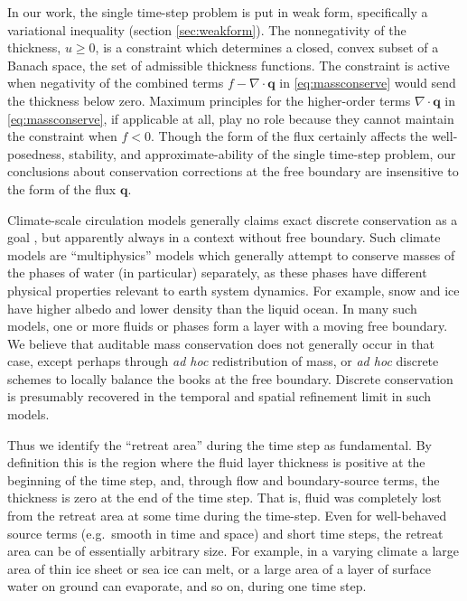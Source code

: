 \documentclass[final,leqno,onefignum,onetabnum]{siamltex1213bueler}
\newcommand\bq{\mathbf{q}}
\newcommand{\Div}{\nabla\cdot}
\begin{document}
In our work, the single time-step problem is put in weak form, specifically a variational inequality (section \ref{sec:weakform}).  The nonnegativity of the thickness, $u\ge 0$, is a constraint which determines a closed, convex subset of a Banach space, the set of admissible thickness functions.  The constraint is active when negativity of the combined terms $f - \Div \bq$ in \eqref{eq:massconserve} would send the thickness below zero.  Maximum principles for the higher-order terms $\Div\bq$ in \eqref{eq:massconserve}, if applicable at all, play no role because they cannot maintain the constraint when $f<0$.  Though the form of the flux certainly affects the well-posedness, stability, and approximate-ability of the single time-step problem, our conclusions about conservation corrections at the free boundary are insensitive to the form of the flux $\bq$.

Climate-scale circulation models generally claims exact discrete conservation as a goal \cite{Thuburn2008}, but apparently always in a context without free boundary.  Such climate models are ``multiphysics'' models which generally attempt to conserve masses of the phases of water (in particular) separately, as these phases have different physical properties relevant to earth system dynamics.  For example, snow and ice have higher albedo and lower density than the liquid ocean.  In many such models, one or more fluids or phases form a layer with a moving free boundary.  We believe that auditable mass conservation does not generally occur in that case, except perhaps through \emph{ad hoc} redistribution of mass, or \emph{ad hoc} discrete schemes to locally balance the books at the free boundary.  Discrete conservation is presumably recovered in the temporal and spatial refinement limit in such models.

Thus we identify the ``retreat area'' during the time step as fundamental.  By definition this is the region where the fluid layer thickness is positive at the beginning of the time step, and, through flow and boundary-source terms, the thickness is zero at the end of the time step.  That is, fluid was completely lost from the retreat area at some time during the time-step.  Even for well-behaved source terms (e.g.~smooth in time and space) and short time steps, the retreat area can be of essentially arbitrary size.  For example, in a varying climate a large area of thin ice sheet or sea ice can melt, or a large area of a layer of surface water on ground can evaporate, and so on, during one time step.
\end{document}

